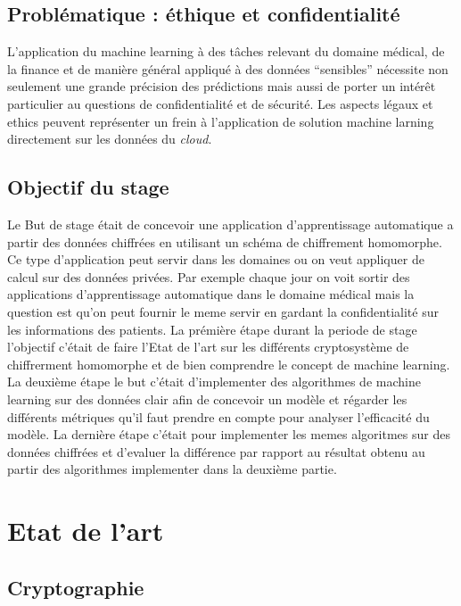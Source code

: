 \documentclass[a4paper,12pt]{article}
\begin{document}
\subsection{Problématique : éthique et confidentialité}
L'application du machine learning à des tâches relevant du domaine  médical, de la finance et de manière général appliqué à des données ``sensibles'' nécessite non seulement une grande précision des prédictions mais aussi de porter un intérêt particulier au questions de confidentialité et de sécurité. Les aspects légaux et ethics peuvent représenter un frein à l'application de solution machine larning directement sur les données du \textit{cloud}.\\
\subsection{Objectif du stage}
Le But de  stage était de concevoir une application d'apprentissage automatique a partir des données chiffrées en utilisant un schéma de chiffrement homomorphe.\newline
Ce type d'application peut servir dans les domaines ou on veut appliquer de calcul sur des données privées.\newline
Par exemple chaque jour on voit sortir des applications d'apprentissage automatique dans le domaine médical mais la question est qu'on peut fournir le meme servir en gardant la confidentialité sur les informations des patients.\newline
La prémière étape durant la periode de stage l'objectif c'était de faire l'Etat de l'art sur les différents cryptosystème de chiffrerment homomorphe et de bien comprendre le concept de machine learning.\newline
La deuxième étape le but c'était d'implementer des algorithmes de machine learning sur des données clair afin de concevoir un modèle et régarder les différents métriques qu'il faut prendre en compte pour analyser l'efficacité du modèle.\newline
La dernière étape c'était pour implementer les memes algoritmes sur des données chiffrées et d'evaluer la différence par rapport au résultat obtenu au partir des algorithmes implementer dans la deuxième partie.\newline
\section{Etat de l'art} 
\subsection{Cryptographie}
\end{document}
